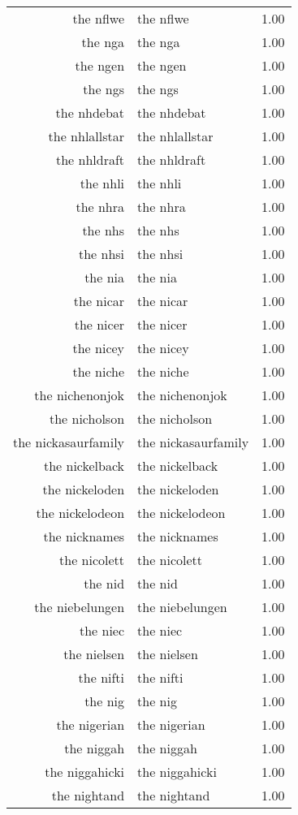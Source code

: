 \begin{table}[ht]
\begin{tabular}{rlr}
  the nflwe & the nflwe & 1.00 \\ 
  the nga & the nga & 1.00 \\ 
  the ngen & the ngen & 1.00 \\ 
  the ngs & the ngs & 1.00 \\ 
  the nhdebat & the nhdebat & 1.00 \\ 
  the nhlallstar & the nhlallstar & 1.00 \\ 
  the nhldraft & the nhldraft & 1.00 \\ 
  the nhli & the nhli & 1.00 \\ 
  the nhra & the nhra & 1.00 \\ 
  the nhs & the nhs & 1.00 \\ 
  the nhsi & the nhsi & 1.00 \\ 
  the nia & the nia & 1.00 \\ 
  the nicar & the nicar & 1.00 \\ 
  the nicer & the nicer & 1.00 \\ 
  the nicey & the nicey & 1.00 \\ 
  the niche & the niche & 1.00 \\ 
  the nichenonjok & the nichenonjok & 1.00 \\ 
  the nicholson & the nicholson & 1.00 \\ 
  the nickasaurfamily & the nickasaurfamily & 1.00 \\ 
  the nickelback & the nickelback & 1.00 \\ 
  the nickeloden & the nickeloden & 1.00 \\ 
  the nickelodeon & the nickelodeon & 1.00 \\ 
  the nicknames & the nicknames & 1.00 \\ 
  the nicolett & the nicolett & 1.00 \\ 
  the nid & the nid & 1.00 \\ 
  the niebelungen & the niebelungen & 1.00 \\ 
  the niec & the niec & 1.00 \\ 
  the nielsen & the nielsen & 1.00 \\ 
  the nifti & the nifti & 1.00 \\ 
  the nig & the nig & 1.00 \\ 
  the nigerian & the nigerian & 1.00 \\ 
  the niggah & the niggah & 1.00 \\ 
  the niggahicki & the niggahicki & 1.00 \\ 
  the nightand & the nightand & 1.00 \\ 

\end{tabular}
\end{table}
